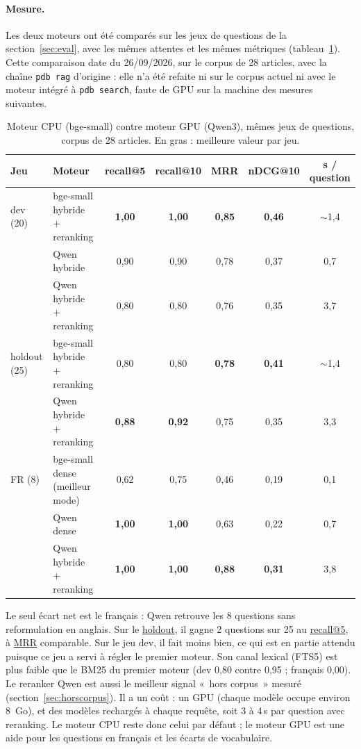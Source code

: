 \documentclass[11pt,a4paper]{article}
\newcommand{\cmd}[1]{\texttt{#1}}
\newcommand{\gl}[2]{\hyperlink{gl:#1}{\textcolor{glcolor}{#2}}}
\begin{document}
\paragraph{Mesure.} Les deux moteurs ont été comparés sur les jeux de questions de la
section~\ref{sec:eval}, avec les mêmes attentes et les mêmes métriques
(tableau~\ref{tab:qwen}). Cette comparaison date du 26/09/2026, sur le corpus de 28
articles, avec la chaîne \cmd{pdb rag} d'origine : elle n'a été refaite ni sur le corpus
actuel ni avec le moteur intégré à \cmd{pdb search}, faute de GPU sur la machine des mesures
suivantes.

\begin{table}[ht]
\centering
\caption{Moteur CPU (bge-small) contre moteur GPU (Qwen3), mêmes jeux de questions, corpus de
28 articles. En gras : meilleure valeur par jeu.}
\label{tab:qwen}
\small
\begin{tabular}{@{}llccccc@{}}
\toprule
Jeu & Moteur & recall@5 & recall@10 & MRR & nDCG@10 & s / question \\
\midrule
dev (20)     & bge-small hybride + reranking & \textbf{1,00} & \textbf{1,00} & \textbf{0,85} & \textbf{0,46} & $\sim$1,4 \\
             & Qwen hybride                  & 0,90 & 0,90 & 0,78 & 0,37 & 0,7 \\
             & Qwen hybride + reranking      & 0,80 & 0,80 & 0,76 & 0,35 & 3,7 \\
\midrule
holdout (25) & bge-small hybride + reranking & 0,80 & 0,80 & \textbf{0,78} & \textbf{0,41} & $\sim$1,4 \\
             & Qwen hybride + reranking      & \textbf{0,88} & \textbf{0,92} & 0,75 & 0,35 & 3,3 \\
\midrule
FR (8)       & bge-small dense (meilleur mode) & 0,62 & 0,75 & 0,46 & 0,19 & 0,1 \\
             & Qwen dense                    & \textbf{1,00} & \textbf{1,00} & 0,63 & 0,22 & 0,7 \\
             & Qwen hybride + reranking      & \textbf{1,00} & \textbf{1,00} & \textbf{0,88} & \textbf{0,31} & 3,8 \\
\bottomrule
\end{tabular}
\end{table}

Le seul écart net est le français : Qwen retrouve les 8 questions sans reformulation en
anglais. Sur le \gl{holdout}{holdout}, il gagne 2 questions sur 25 au \gl{recall}{recall@5}, à \gl{MRR}{MRR} comparable. Sur le
jeu dev, il fait moins bien, ce qui est en partie attendu puisque ce jeu a servi à régler le
premier moteur. Son canal lexical (FTS5) est plus faible que le BM25 du premier moteur (dev
0,80 contre 0,95 ; français 0,00). Le reranker Qwen est aussi le meilleur signal «~hors
corpus~» mesuré (section~\ref{sec:horscorpus}). Il a un coût : un GPU (chaque modèle occupe environ 8~Go), et des
modèles rechargés à chaque requête, soit 3 à 4\,s par question avec reranking. Le moteur
CPU reste donc celui par défaut ; le moteur GPU est une aide pour les questions en
français et les écarts de vocabulaire.
\end{document}
